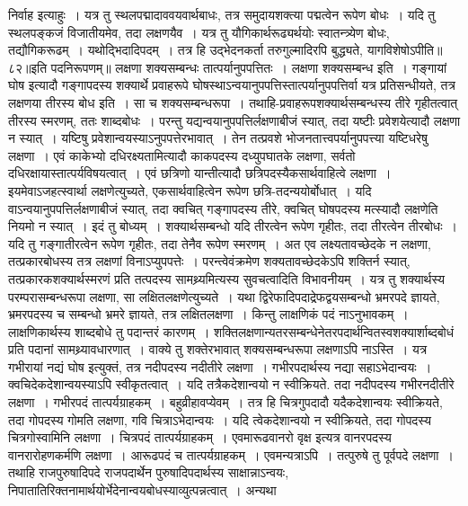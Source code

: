 निर्वाह इत्याहुः~। यत्र तु स्थलपद्मादाववयवार्थबाधः, तत्र समुदायशक्त्या पद्मत्वेन रूपेण बोधः~। यदि तु स्थलपङ्कजं विजातीयमेव, तदा लक्षणयैव~।
यत्र तु यौगिकार्थरूढ्यर्थयोः स्वातन्त्र्येण बोधः, तद्यौगिकरूढम्~। यथोद्भिदादिपदम्~। तत्र हि उद्भेदनकर्ता तरुगुल्मादिरपि बुद्ध्यते, यागविशेषोऽपीति॥८२॥इति
पदनिरूपणम्॥
लक्षणा शक्यसम्बन्धः तात्पर्यानुपपत्तितः~।
लक्षणा शक्यसम्बन्ध इति~। गङ्गायां घोष इत्यादौ गङ्गापदस्य शक्यार्थे प्रवाहरूपे घोषस्थाऽन्वयानुपपत्तिस्तात्पर्यानुपपत्तिर्वा यत्र प्रतिसन्धीयते, तत्र लक्षणया
तीरस्य बोध इति~। सा च शक्यसम्बन्धरूपा~। तथाहि-प्रवाहरूपशक्यार्थसम्बन्धस्य तीरे गृहीतत्वात् तीरस्य स्मरणम्, ततः शाब्दबोधः~। परन्तु यद्यन्वयानुपपत्तिर्लक्षणाबीजं
स्यात्, तदा यष्टीः प्रवेशयेत्यादौ लक्षणा न स्यात्~। यष्टिषु प्रवेशान्वयस्याऽनुपपत्तेरभावात्~। तेन तत्प्रवशे भोजनतात्त्वपर्यानुपपत्त्या यष्टिधरेषु लक्षणा~। एवं काकेभ्यो
दधिरक्ष्यतामित्यादौ काकपदस्य दध्युपघातके लक्षणा, सर्वतो दधिरक्षायास्तात्पर्यविषयत्वात्~। एवं छत्रिणो यान्तीत्यादौ छत्रिपदस्यैकसार्थवाहित्वे लक्षणा~। इयमेवाऽजहत्स्वार्था
लक्षणेत्युच्यते, एकसार्थवाहित्वेन रूपेण छत्रि-तदन्ययोर्बोधात्~। यदि वाऽन्वयानुपपत्तिर्लक्षणाबीजं स्यात्, तदा क्वचित् गङ्गापदस्य तीरे, क्वचित् घोषपदस्य मत्स्यादौ
लक्षणेति नियमो न स्यात्~।
इदं तु बोध्यम्~। शक्यार्थसम्बन्धो यदि तीरत्वेन रूपेण गृहीतः, तदा तीरत्वेन तीरबोधः~। यदि तु गङ्गातीरत्वेन रूपेण गृहीतः, तदा तेनैव रूपेण स्मरणम्~। अत
एव लक्ष्यतावच्छेदके न लक्षणा, तत्प्रकारबोधस्य तत्र लक्षणां विनाऽप्युपपत्तेः~। परन्त्वेवंक्रमेण शक्यतावच्छेदकेऽपि शक्तिर्न स्यात्, तत्प्रकारकशक्यार्थस्मरणं प्रति
तत्पदस्य सामथ्र्यमित्यस्य सुवचत्वादिति विभावनीयम्~।
यत्र तु शक्यार्थस्य परम्परासम्बन्धरूपा लक्षणा, सा लक्षितलक्षणेत्युच्यते~। यथा द्विरेफादिपदाद्रेफद्वयसम्बन्धो भ्रमरपदे ज्ञायते, भ्रमरपदस्य च सम्बन्धो भ्रमरे
ज्ञायते, तत्र लक्षितलक्षणा~।
किन्तु लाक्षणिकं पदं नाऽनुभावकम्~। लाक्षणिकार्थस्य शाब्दबोधे तु पदान्तरं कारणम्~। शक्तिलक्षणान्यतरसम्बन्धेनेतरपदार्थन्वितस्वशक्यार्शाब्दबोधं प्रति पदानां
सामथ्र्यावधारणात्~।
वाक्ये तु शक्तेरभावात् शक्यसम्बन्धरूपा लक्षणाऽपि नाऽस्ति~। यत्र गभीरायां नद्यं घोष इत्युक्तं, तत्र नदीपदस्य नदीतीरे लक्षणा~। गभीरपदार्थस्य नद्या
सहाऽभेदान्वयः~। क्वचिदेकदेशान्वयस्याऽपि स्वीकृतत्वात्~। यदि तत्रैकदेशान्वयो न स्वीक्रियते. तदा नदीपदस्य गभीरनदीतीरे लक्षणा~। गभीरपदं तात्पर्यग्राहकम्~।
बहुव्रीहावप्येवम्~। तत्र हि चित्रगुपदादौ यदैकदेशान्वयः स्वीक्रियते, तदा गोपदस्य गोमति लक्षणा, गवि चित्राऽभेदान्वयः~। यदि त्वेकदेशान्वयो न स्वीक्रियते, तदा
गोपदस्य चित्रगोस्वामिनि लक्षणा~। चित्रपदं तात्पर्यग्राहकम्~। एवमारूढवानरो वृक्ष इत्यत्र वानरपदस्य वानरारोहणकर्मणि लक्षणा~। आरूढपदं च तात्पर्यग्राहकम्~।
एवमन्यत्राऽपि~।
तत्पुरुषे तु पूर्वपदे लक्षणा~। तथाहि राजपुरुषादिपदे राजपदार्थेन पुरुषादिपदार्थस्य साक्षान्नाऽन्वयः, निपातातिरिक्तनामार्थयोर्भेदेनान्वयबोधस्याव्युत्पन्नत्वात्~। अन्यथा

